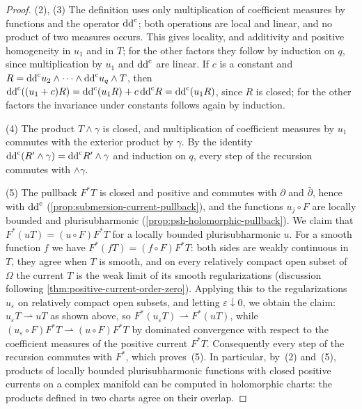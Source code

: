 \begin{proof}
(2), (3) The definition uses only multiplication of coefficient measures by functions and the operator $\mathrm{dd}^{\mathrm{c}}$; both operations are local and linear, and no product of two measures occurs. This gives locality, and additivity and positive homogeneity in $u_1$ and in $T$; for the other factors they follow by induction on $q$, since multiplication by $u_1$ and $\mathrm{dd}^{\mathrm{c}}$ are linear. If $c$ is a constant and $R=\mathrm{dd}^{\mathrm{c}} u_2\wedge\cdots\wedge\mathrm{dd}^{\mathrm{c}} u_q\wedge T$, then $\mathrm{dd}^{\mathrm{c}}((u_1+c)R)=\mathrm{dd}^{\mathrm{c}}(u_1R)+c\,\mathrm{dd}^{\mathrm{c}} R=\mathrm{dd}^{\mathrm{c}}(u_1R)$, since $R$ is closed; for the other factors the invariance under constants follows again by induction.

(4) The product $T\wedge\gamma$ is closed, and multiplication of coefficient measures by $u_1$ commutes with the exterior product by $\gamma$. By the identity $\mathrm{dd}^{\mathrm{c}}(R'\wedge\gamma)=\mathrm{dd}^{\mathrm{c}} R'\wedge\gamma$ and induction on $q$, every step of the recursion commutes with $\wedge\gamma$.

(5) The pullback $F^*T$ is closed and positive and commutes with $\partial$ and $\bar\partial$, hence with $\mathrm{dd}^{\mathrm{c}}$ (\cref{prop:submersion-current-pullback}), and the functions $u_j\circ F$ are locally bounded and plurisubharmonic (\cref{prop:psh-holomorphic-pullback}). We claim that $F^*(uT)=(u\circ F)F^*T$ for a locally bounded plurisubharmonic $u$. For a smooth function $f$ we have $F^*(fT)=(f\circ F)F^*T$: both sides are weakly continuous in $T$, they agree when $T$ is smooth, and on every relatively compact open subset of $\Omega$ the current $T$ is the weak limit of its smooth regularizations (discussion following \cref{thm:positive-current-order-zero}). Applying this to the regularizations $u_\varepsilon$ on relatively compact open subsets, and letting $\varepsilon\downarrow0$, we obtain the claim: $u_\varepsilon T\rightharpoonup uT$ as shown above, so $F^*(u_\varepsilon T)\rightharpoonup F^*(uT)$, while $(u_\varepsilon\circ F)F^*T\rightharpoonup(u\circ F)F^*T$ by dominated convergence with respect to the coefficient measures of the positive current $F^*T$. Consequently every step of the recursion commutes with $F^*$, which proves~(5). In particular, by~(2) and~(5), products of locally bounded plurisubharmonic functions with closed positive currents on a complex manifold can be computed in holomorphic charts: the products defined in two charts agree on their overlap.
\end{proof}

